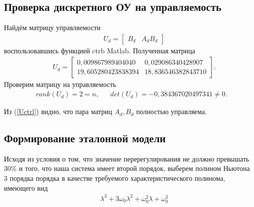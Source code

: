 \documentclass[fleqn, a4paper, 11pt, russian]{article}
\begin{document}
	\subsection{Проверка дискретного ОУ на управляемость}
	Найдём матрицу управляемости
	\begin{align}
		&&U_d = \begin{bmatrix}
			B_d & A_dB_d
		\end{bmatrix}
	\end{align}
	воспользовавшись функцией ctrb Matlab. Полученная матрица
	\begin{align}
		&&U_d = \begin{bmatrix}
			0,009867989404040 & 0,029086340428907\\
			19,605280423838394 & 18,836546382843710
		\end{bmatrix}.
	\end{align}
	Проверим матрицу на управляемость
	\begin{align} \label{Uctrl}
		&rank(U_d) = 2 = n, &&det(U_d) = -0,384367020497341 \neq 0.
	\end{align}
	
	Из (\ref{Uctrl}) видно, что пара матриц $A_d, B_d$ полностью управляема.
	
	\subsection{Формирование эталонной модели}
	Исходя из условия о том, что значение перерегулирования не должно превышать 30\% и того, что наша система имеет второй порядок, выберем полином Ньютона 3 порядка порядка в качестве требуемого характеристического полинома, имеющего вид
	\begin{align} \label{Btrw}
		&&\lambda^3 + 3\omega_0\lambda^2 + \omega_0^2\lambda + \omega_0^3
	\end{align}
	
\end{document}
